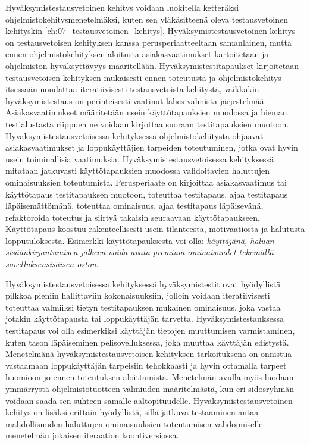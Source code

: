   Hyväksymistestausvetoinen kehitys voidaan luokitella ketteräksi ohjelmistokehitysmenetelmäksi, kuten sen yläkäsitteenä oleva testausvetoinen kehityskin \ref{ch:07_testausvetoinen_kehitys}.
  Hyväksymistestausvetoinen kehitys on testausvetoisen kehityksen kanssa perusperiaatteeltaan samanlainen, mutta ennen ohjelmistokehityksen aloitusta asiakasvaatimukset kartoitetaan ja ohjelmiston hyväksyttävyys määritellään.
  Hyväksymistestitapaukset kirjoitetaan testausvetoisen kehityksen mukaisesti ennen toteutusta ja ohjelmistokehitys itsessään noudattaa iteratiivisesti testausvetoista kehitystä, vaikkakin hyväksymistestaus on perinteisesti vaatinut lähes valmista järjestelmää.
  Asiakasvaatimukset määritetään usein käyttötapauksien muodossa ja hieman testialustasta riippuen ne voidaan kirjottaa suoraan testitapauksien muotoon.
  Hyväksymistestausvetoisessa kehityksessä ohjelmistokehitystä ohjaavat asiakasvaatimukset ja loppukäyttäjien tarpeiden toteutuminen, jotka ovat hyvin usein toiminallisia vaatimuksia.
  Hyväksymistestausvetoisessa kehityksessä mitataan jatkuvasti käyttötapauksien muodossa validoitavien haluttujen ominaisuuksien toteutumista.
  Perusperiaate on kirjoittaa asiakasvaatimus tai käyttötapaus testitapauksen muotoon, toteuttaa testitapaus, ajaa testitapaus läpäisemättömänä, toteuttaa ominaisuus, ajaa testitapaus läpäisevänä, refaktoroida toteutus ja siirtyä takaisin seuraavaan käyttötapaukseen.
  Käyttötapaus koostuu rakenteellisesti usein tilanteesta, motivaatiosta ja halutusta lopputuloksesta.
  Esimerkki käyttötapauksesta voi olla: \emph{käyttäjänä, haluan sisäänkirjautumisen jälkeen voida avata premium ominaisuudet tekemällä sovelluksensisäisen oston}.

  Hyväksymistestausvetoisessa kehityksessä hyväksymistestit ovat hyödyllistä pilkkoa pieniin hallittaviin kokonaisuuksiin, jolloin voidaan iteratiivisesti toteuttaa valmiiksi tietyn testitapauksen mukainen ominaisuus, joka vastaa jotakin käyttötapausta tai loppukäyttäjän tarvetta.
  Hyväksymistestauksessa testitapaus voi olla esimerkiksi käyttäjän tietojen muuttumisen varmistaminen, kuten tason läpäiseminen pelisovelluksessa, joka muuttaa käyttäjän edistystä.
  Menetelmänä hyväksymistestausvetoisen kehityksen tarkoituksena on onnistua vastaamaan loppukäyttäjän tarpeisiin tehokkaasti ja hyvin ottamalla tarpeet huomioon jo ennen toteutuksen aloittamista.
  Menetelmän avulla myös luodaan ymmärrystä ohjelmistotuotteen valmiuden määritelmästä, kun eri sidosryhmän voidaan saada sen suhteen samalle aaltopituudelle.
  Hyväksymistestausvetoinen kehitys on lisäksi erittäin hyödyllistä, sillä jatkuva testaaminen antaa mahdollisuuden haluttujen ominaisuuksien toteutumisen validoimiselle menetelmän jokaisen iteraation koontiversiossa.

